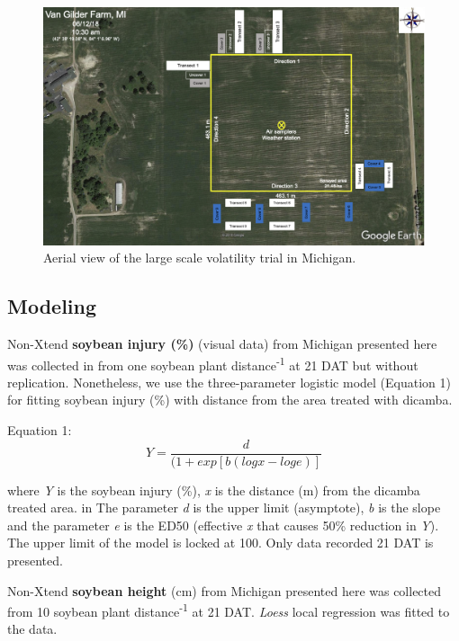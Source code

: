 \documentclass[]{article}
\begin{document}
\begin{figure}[h]

{\centering \includegraphics[width=1\linewidth]{Michigan} 

}

\caption{Aerial view of the large scale volatility trial in Michigan.}\label{fig:unnamed-chunk-40}
\end{figure}

\pagebreak

\subsection{Modeling}\label{modeling-2}

Non-Xtend \textbf{soybean injury (\%)} (visual data) from Michigan
presented here was collected in from one soybean plant
distance\textsuperscript{-1} at 21 DAT but without replication.
Nonetheless, we use the three-parameter logistic model (Equation 1) for
fitting soybean injury (\%) with distance from the area treated with
dicamba.

Equation 1: \[Y= \frac{d}{(1 + exp[b(logx - loge)]} \]

where \emph{Y} is the soybean injury (\%), \emph{x} is the distance (m)
from the dicamba treated area. in The parameter \emph{d} is the upper
limit (asymptote), \emph{b} is the slope and the parameter \emph{e} is
the ED50 (effective \emph{x} that causes 50\% reduction in \emph{Y}).
The upper limit of the model is locked at 100. Only data recorded 21 DAT
is presented.

Non-Xtend \textbf{soybean height} (cm) from Michigan presented here was
collected from 10 soybean plant distance\textsuperscript{-1} at 21 DAT.
\emph{Loess} local regression was fitted to the data.
\end{document}
